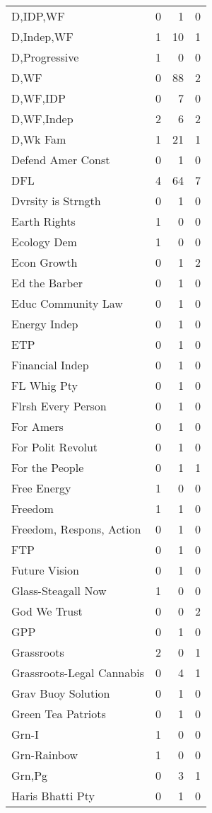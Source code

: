 \begin{supertabular}{lrrr}
D,IDP,WF & 0 & 1 & 0\\
D,Indep,WF & 1 & 10 & 1\\
D,Progressive & 1 & 0 & 0\\
D,WF & 0 & 88 & 2\\
D,WF,IDP & 0 & 7 & 0\\
D,WF,Indep & 2 & 6 & 2\\
D,Wk Fam & 1 & 21 & 1\\
Defend Amer Const & 0 & 1 & 0\\
DFL & 4 & 64 & 7\\
Dvrsity is Strngth & 0 & 1 & 0\\
Earth Rights & 1 & 0 & 0\\
Ecology Dem & 1 & 0 & 0\\
Econ Growth & 0 & 1 & 2\\
Ed the Barber & 0 & 1 & 0\\
Educ Community Law & 0 & 1 & 0\\
Energy Indep & 0 & 1 & 0\\
ETP & 0 & 1 & 0\\
Financial Indep & 0 & 1 & 0\\
FL Whig Pty & 0 & 1 & 0\\
Flrsh Every Person & 0 & 1 & 0\\
For Amers & 0 & 1 & 0\\
For Polit Revolut & 0 & 1 & 0\\
For the People & 0 & 1 & 1\\
Free Energy & 1 & 0 & 0\\
Freedom & 1 & 1 & 0\\
Freedom, Respons, Action & 0 & 1 & 0\\
FTP & 0 & 1 & 0\\
Future Vision & 0 & 1 & 0\\
Glass-Steagall Now & 1 & 0 & 0\\
God We Trust & 0 & 0 & 2\\
GPP & 0 & 1 & 0\\
Grassroots & 2 & 0 & 1\\
Grassroots-Legal Cannabis & 0 & 4 & 1\\
Grav Buoy Solution & 0 & 1 & 0\\
Green Tea Patriots & 0 & 1 & 0\\
Grn-I & 1 & 0 & 0\\
Grn-Rainbow & 1 & 0 & 0\\
Grn,Pg & 0 & 3 & 1\\
Haris Bhatti Pty & 0 & 1 & 0\\

\end{supertabular}
